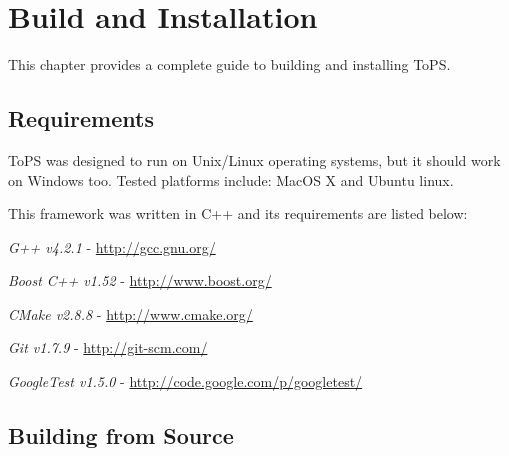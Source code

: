 \chapter{Build and Installation}

This chapter provides a complete guide to building and installing ToPS.

\section{Requirements}

ToPS was designed to run on Unix/Linux operating systems, but it should work on Windows too. Tested platforms include: MacOS X and Ubuntu linux.

This framework was written in C++ and its requirements are listed below:

\begin{list}{*}{}
  \item \emph{G++ v4.2.1} - \url{http://gcc.gnu.org/}
  \item \emph{Boost C++ v1.52} - \url{http://www.boost.org/}
  \item \emph{CMake v2.8.8} - \url{http://www.cmake.org/}
  \item \emph{Git v1.7.9} - \url{http://git-scm.com/}
  \item \emph{GoogleTest v1.5.0} - \url{http://code.google.com/p/googletest/}
\end{list}

\section{Building from Source}

